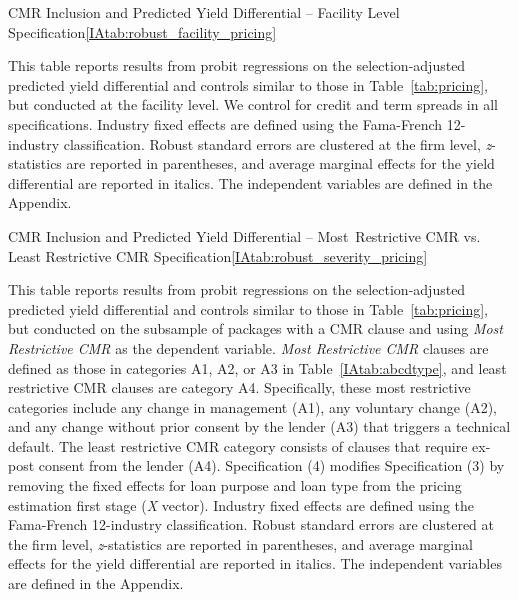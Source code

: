 \documentclass[12pt]{article}
\begin{document}
\begin{appendices}
\begin{singlespace}
\begin{papertable}{CMR Inclusion and Predicted Yield Differential -- Facility Level Specification}{\ref{IAtab:robust_facility_pricing}}{}
  \label{IAtab:robust_facility_pricing}

  This table reports results from probit regressions on the selection-adjusted predicted yield differential and controls similar to those in Table~\ref{tab:pricing}, but conducted at the facility level.
  We control for credit and term spreads in all specifications.
  Industry fixed effects are defined using the Fama-French 12-industry classification.
  Robust standard errors are clustered at the firm level, \textit{z}-statistics are reported in parentheses, and average marginal effects for the yield differential are reported in italics.
  The independent variables are defined in the Appendix.
  \postamblesig

  \startdata
  

\end{papertable}



\begin{papertable}{CMR Inclusion and Predicted Yield Differential -- Most~Restrictive CMR vs. Least Restrictive CMR Specification}{\ref{IAtab:robust_severity_pricing}}{}
  \label{IAtab:robust_severity_pricing}

    This table reports results from probit regressions on the selection-adjusted predicted yield differential and controls similar to those in Table~\ref{tab:pricing}, but conducted on the subsample of packages with a CMR clause and using \textit{Most Restrictive CMR} as the dependent variable.
    \textit{Most Restrictive CMR} clauses are defined as those in categories A1, A2, or A3 in Table~\ref{IAtab:abcdtype}, and least restrictive CMR clauses are category A4.
    Specifically, these most restrictive categories include any change in management (A1), any voluntary change (A2), and any change without prior consent by the lender (A3) that triggers a technical default.
    The least restrictive CMR category consists of clauses that require {ex-post} consent from the lender (A4).
    Specification (4) modifies Specification (3) by removing the fixed effects for loan purpose and loan type from the pricing estimation first stage (\textit{X} vector).
    Industry fixed effects are defined using the Fama-French 12-industry classification.
    Robust standard errors are clustered at the firm level, \textit{z}-statistics are reported in parentheses, and average marginal effects for the yield differential are reported in italics.
    The independent variables are defined in the Appendix.
    \postamblesig


\end{papertable}
\end{singlespace}
\end{appendices}
\end{document}
